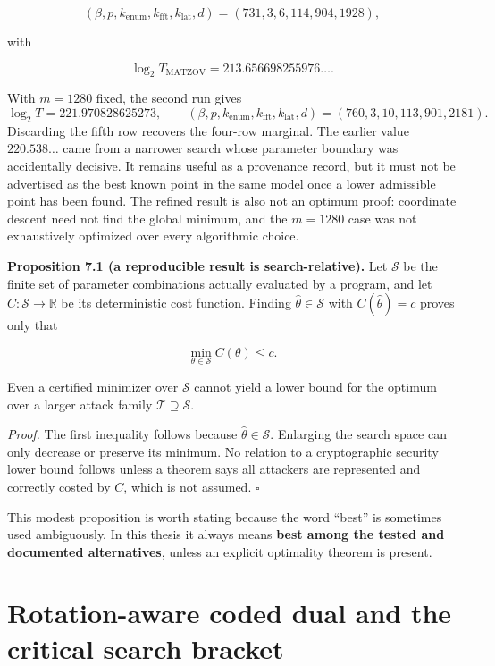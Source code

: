 \documentclass[
  11pt,
  a4paper,
  oneside]{report}
\begin{document}
\[
(\beta,p,k_{\mathrm{enum}},k_{\mathrm{fft}},k_{\mathrm{lat}},d)
=(731,3,6,114,904,1928),
\]

with

\[
\boxed{\log_2 T_{\mathrm{MATZOV}}=213.656698255976\ldots.}
\]

With \(m=1280\) fixed, the second run gives \[
\log_2 T=221.970828625273,\qquad
(\beta,p,k_{\mathrm{enum}},k_{\mathrm{fft}},k_{\mathrm{lat}},d)=(760,3,10,113,901,2181).
\] Discarding the fifth row recovers the four-row marginal. The earlier
value \(220.538\ldots\) came from a narrower search whose parameter
boundary was accidentally decisive. It remains useful as a provenance
record, but it must not be advertised as the best known point in the
same model once a lower admissible point has been found. The refined
result is also not an optimum proof: coordinate descent need not find
the global minimum, and the \(m=1280\) case was not exhaustively
optimized over every algorithmic choice.

\textbf{Proposition 7.1 (a reproducible result is search-relative).} Let
\(\mathcal S\) be the finite set of parameter combinations actually
evaluated by a program, and let \(C:\mathcal S\to\mathbb R\) be its
deterministic cost function. Finding \(\widehat\theta\in\mathcal S\)
with \(C(\widehat\theta)=c\) proves only that

\[
\min_{\theta\in\mathcal S}C(\theta)\le c.
\]

Even a certified minimizer over \(\mathcal S\) cannot yield a lower
bound for the optimum over a larger attack family
\(\mathcal T\supseteq\mathcal S\).

\emph{Proof.} The first inequality follows because
\(\widehat\theta\in\mathcal S\). Enlarging the search space can only
decrease or preserve its minimum. No relation to a cryptographic
security lower bound follows unless a theorem says all attackers are
represented and correctly costed by \(C\), which is not assumed.
\(\square\)

This modest proposition is worth stating because the word ``best'' is
sometimes used ambiguously. In this thesis it always means \textbf{best
among the tested and documented alternatives}, unless an explicit
optimality theorem is present.

\section{Rotation-aware coded dual and the critical search
bracket}\label{rotation-aware-coded-dual-and-the-critical-search-bracket}
\end{document}
